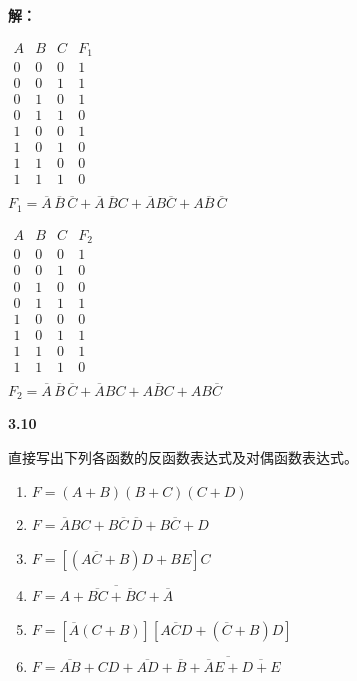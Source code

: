 \documentclass[10pt, a4paper]{article}
\newcommand{\question}[2]{
    \vspace{2ex}\noindent\textbf{#1}\ {\kaishu #2} \par\vspace{1ex}
}
\newcommand{\solution}[1]{
    \noindent\textbf{解：}{\songti #1} \par\vspace{3ex}
}
\begin{document}
\solution{
\begin{enumerate}
	\begin{minipage}[t]{0.48\textwidth}
	\item 
	$
	\begin{array}{ccc|c}
		A & B & C & F_1 \\ \hline
		0 & 0 & 0 & 1 \\
		0 & 0 & 1 & 1 \\
		0 & 1 & 0 & 1 \\
		0 & 1 & 1 & 0 \\
		1 & 0 & 0 & 1 \\
		1 & 0 & 1 & 0 \\
		1 & 1 & 0 & 0 \\
		1 & 1 & 1 & 0 \\
	\end{array}
	$ \\
	$ F_1 = \overline{A}\,\overline{B}\,\overline{C} + \overline{A}\,\overline{B}C + \overline{A}B\overline{C} + A\overline{B}\,\overline{C} $
	\end{minipage}
	\hfill
	\begin{minipage}[t]{0.48\textwidth}
	\item 
	$
	\begin{array}{ccc|c}
		A & B & C & F_2 \\ \hline
		0 & 0 & 0 & 1 \\
		0 & 0 & 1 & 0 \\
		0 & 1 & 0 & 0 \\
		0 & 1 & 1 & 1 \\
		1 & 0 & 0 & 0 \\
		1 & 0 & 1 & 1 \\
		1 & 1 & 0 & 1 \\
		1 & 1 & 1 & 0 \\
	\end{array}
	$ \\
	$ F_2 = \overline{A}\,\overline{B}\,\overline{C} + \overline{A}BC + A\overline{B}C + AB\overline{C} $
	\end{minipage}
\end{enumerate}
}

\question{3.10}{
直接写出下列各函数的反函数表达式及对偶函数表达式。
\begin{enumerate}
	\item $ F = (A+B)(B+C)(C+D) $
	\item $ F = \overline{A}BC + B\overline{C}\,\overline{D} + B\overline{C} + D $
	\item $ F = [(A\overline{C} + B)D + BE]C $
	\item $ F = \overline{A + \overline{BC} + \overline{B}C + \overline{A}} $
	\item $ F = [\overline{A}(C + B)][A\overline{C}D + (\overline{C} + B)D] $
	\item $ F = \overline{AB} + CD + \overline{AD} + \overline{\overline{B} + \overline{A}E + \overline{D + E}} $
\end{enumerate}
}
\end{document}
